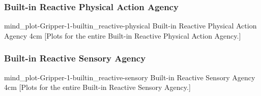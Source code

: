 {\newpage
  \noindent\begin{minipage}{\textwidth}
    \subsubsection{Built-in Reactive Physical Action Agency}
    \experimentcausegroupplots{\dataappendixmaxtime}
                           {\dataappendixexperimentonemaxtime}
                           {\dataappendixexperimenttwomaxtime}
                           {\dataappendixexperimentthreemaxtime}
                           {\dataappendixexperimentonename}
                           {\dataappendixexperimenttwoname}
                           {\dataappendixexperimentthreename}
                           {\dataappendixexperimentoneprettyname}
                           {\dataappendixexperimenttwoprettyname}
                           \experimentcausegroupplotscontinued{\dataappendixexperimentthreeprettyname}
                                                              {mind_plot-Gripper-1-builtin_reactive-physical}
                                                              {Built-in Reactive Physical Action Agency}
                                                              {\experimentdatacommontablereference}
                                                              {4cm}
    \experimentdatablocksworldexample
    [Plots for the entire
      Built-in Reactive Physical Action Agency.]{}
  \label{figure:mind_plot-Gripper-1-builtin_reactive-physical}
  \end{minipage}
}
{\newpage
  \noindent\begin{minipage}{\textwidth}
    \subsubsection{Built-in Reactive Sensory Agency}
    \experimentcausegroupplots{\dataappendixmaxtime}
                           {\dataappendixexperimentonemaxtime}
                           {\dataappendixexperimenttwomaxtime}
                           {\dataappendixexperimentthreemaxtime}
                           {\dataappendixexperimentonename}
                           {\dataappendixexperimenttwoname}
                           {\dataappendixexperimentthreename}
                           {\dataappendixexperimentoneprettyname}
                           {\dataappendixexperimenttwoprettyname}
                           \experimentcausegroupplotscontinued{\dataappendixexperimentthreeprettyname}
                                                              {mind_plot-Gripper-1-builtin_reactive-sensory}
                                                              {Built-in Reactive Sensory Agency}
                                                              {\experimentdatacommontablereference}
                                                              {4cm}
    \experimentdatablocksworldexample
    [Plots for the entire
      Built-in Reactive Sensory Agency.]{}
  \label{figure:mind_plot-Gripper-1-builtin_reactive-sensory}
  \end{minipage}
}
